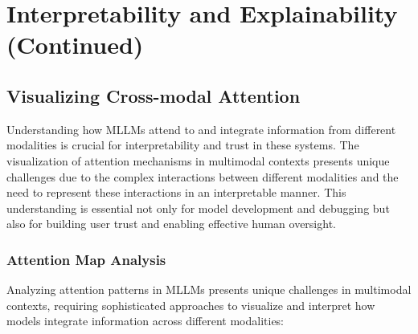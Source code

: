 \section{Interpretability and Explainability (Continued)}

\subsection{Visualizing Cross-modal Attention}
Understanding how MLLMs attend to and integrate information from different modalities is crucial for interpretability and trust in these systems. The visualization of attention mechanisms in multimodal contexts presents unique challenges due to the complex interactions between different modalities and the need to represent these interactions in an interpretable manner. This understanding is essential not only for model development and debugging but also for building user trust and enabling effective human oversight.

\subsubsection{Attention Map Analysis}
Analyzing attention patterns in MLLMs presents unique challenges in multimodal contexts, requiring sophisticated approaches to visualize and interpret how models integrate information across different modalities:

